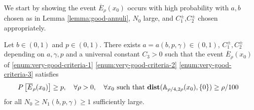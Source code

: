 \documentclass[12pt]{amsart}
\numberwithin{equation}{section}
\begin{document}
	We start by showing the event $\overline E_\rho(x_0)$ occurs with high probability 
	with $a,b$ chosen as in Lemma \ref{lemma:good-annuli},  $N_0$ large, and $C^{\pm}_1$,$C^{\pm}_2$
	chosen appropriately. 
	
	
	\begin{lemma} \label{lemma:very-good-annuli-hit}
		Let $b \in (0,1)$ and $p \in (0,1)$.
		There exists $a = a(b,p,\gamma) \in (0,1)$,  $C^{\pm}_1, C^{\pm}_2$ depending on $a, \gamma, p$
		and a universal constant $C_3>0$ such that the event $\overline E_\rho(x_0)$ of \ref{enum:very-good-criteria-1} \ref{enum:very-good-criteria-2} \ref{enum:very-good-criteria-3} satisfies 
		\[
		P\left[ \overline E_\rho(x_0) \right] \geq p ,\quad \forall \rho > 0,\quad \forall x_0 \mbox{ such that $\mathop{\bf dist{}}(\mathbb{A}_{\rho/4, 2 \rho}(x_0), \{0\}) \geq \rho/100$}
		\]
		for all $N_0 \geq N_1(b,p,\gamma) \geq 1$ sufficiently large. 
	\end{lemma}
	
\end{document}
